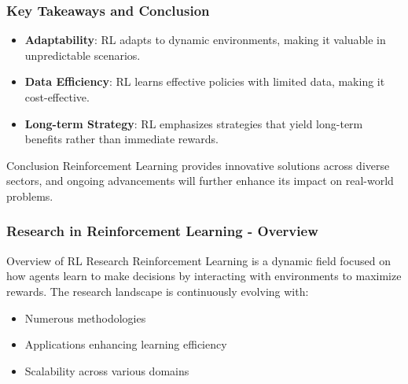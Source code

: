 \documentclass[aspectratio=169]{beamer}
\begin{document}
\begin{frame}[fragile]
    \frametitle{Key Takeaways and Conclusion}
    \begin{itemize}
        \item \textbf{Adaptability}: RL adapts to dynamic environments, making it valuable in unpredictable scenarios.
        \item \textbf{Data Efficiency}: RL learns effective policies with limited data, making it cost-effective.
        \item \textbf{Long-term Strategy}: RL emphasizes strategies that yield long-term benefits rather than immediate rewards.
    \end{itemize}
    \begin{block}{Conclusion}
        Reinforcement Learning provides innovative solutions across diverse sectors, and ongoing advancements will further enhance its impact on real-world problems.
    \end{block}
\end{frame}

\begin{frame}[fragile]
    \frametitle{Research in Reinforcement Learning - Overview}
    \begin{block}{Overview of RL Research}
        Reinforcement Learning is a dynamic field focused on how agents learn to make decisions by interacting with environments to maximize rewards. The research landscape is continuously evolving with:
    \end{block}
    \begin{itemize}
        \item Numerous methodologies 
        \item Applications enhancing learning efficiency
        \item Scalability across various domains
    \end{itemize}
\end{frame}
\end{document}

